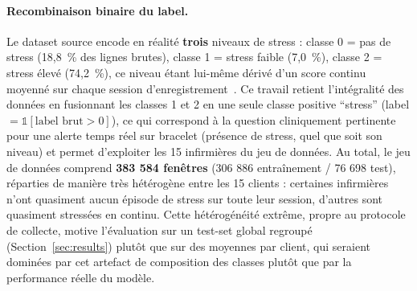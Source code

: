 \documentclass{article}
\begin{document}
\paragraph{Recombinaison binaire du label.} Le dataset source encode en réalité
\textbf{trois} niveaux de stress : classe 0 = pas de stress (18,8~\% des lignes
brutes), classe 1 = stress faible (7,0~\%), classe 2 = stress élevé (74,2~\%), ce
niveau étant lui-même dérivé d'un score continu moyenné sur chaque session
d'enregistrement~\cite{nurse_stress_dataset}. Ce travail retient l'intégralité des
données en fusionnant les classes 1 et 2 en une seule classe positive ``stress''
(label $= \mathbb{1}[\text{label brut} > 0]$), ce qui correspond à la question
cliniquement pertinente pour une alerte temps réel sur bracelet (présence de stress,
quel que soit son niveau) et permet d'exploiter les 15 infirmières du jeu de données.
Au total, le jeu de données comprend \textbf{383 584 fenêtres} (306 886
entraînement / 76 698 test),
réparties de manière très hétérogène entre les 15 clients : certaines infirmières
n'ont quasiment aucun épisode de stress sur toute leur session, d'autres sont
quasiment stressées en continu. Cette hétérogénéité extrême, propre au protocole de
collecte, motive l'évaluation sur un test-set global regroupé (Section~\ref{sec:results})
plutôt que sur des moyennes par client, qui seraient dominées par cet artefact de
composition des classes plutôt que par la performance réelle du modèle.
\end{document}
